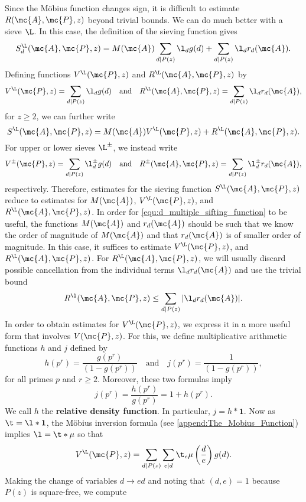     Since the M\"obius function changes sign, it is difficult to estimate $R(\mc{A},\mc{P},z)$ beyond trivial bounds. We can do much better with a sieve $\L$. In this case, the definition of the sieving function gives
    \[
      S_{d}^{\L}(\mc{A},\mc{P},z) = M(\mc{A})\sum_{d \mid P(z)}\l_{d}g(d)+\sum_{d \mid P(z)}\l_{d}r_{d}(\mc{A}).
    \]
    Defining functions $V^{\L}(\mc{P},z)$ and $R^{\L}(\mc{A},\mc{P},z)$ by
     \[
      V^{\L}(\mc{P},z) = \sum_{d \mid P(z)}\l_{d}g(d) \quad \text{and} \quad R^{\L}(\mc{A},\mc{P},z) = \sum_{d \mid P(z)}\l_{d}r_{d}(\mc{A}),
    \]
    for $z \ge 2$, we can further write
    \[
      S^{\L}(\mc{A},\mc{P},z) = M(\mc{A})V^{\L}(\mc{P},z)+R^{\L}(\mc{A},\mc{P},z).
    \]
    For upper or lower sieves $\L^{\pm}$, we instead write
     \[
      V^{\pm}(\mc{P},z) = \sum_{d \mid P(z)}\l_{d}^{\pm}g(d) \quad \text{and} \quad R^{\pm}(\mc{A},\mc{P},z) = \sum_{d \mid P(z)}\l_{d}^{\pm}r_{d}(\mc{A}),
    \]
    respectively. Therefore, estimates for the sieving function $S^{\L}(\mc{A},\mc{P},z)$ reduce to estimates for $M(\mc{A})$, $V^{\L}(\mc{P},z)$, and $R^{\L}(\mc{A},\mc{P},z)$. In order for \cref{equ:d_multiple_sifting_function} to be useful, the functions $M(\mc{A})$ and $r_{d}(\mc{A})$ should be such that we know the order of magnitude of $M(\mc{A})$ and that $r_{d}(\mc{A})$ is of smaller order of magnitude. In this case, it suffices to estimate $V^{\L}(\mc{P},z)$, and $R^{\L}(\mc{A},\mc{P},z)$. For $R^{\L}(\mc{A},\mc{P},z)$, we will usually discard possible cancellation from the individual terms $\l_{d}r_{d}(\mc{A})$ and use the trivial bound
    \[
      R^{\l}(\mc{A},\mc{P},z) \le \sum_{d \mid P(z)}|\l_{d}r_{d}(\mc{A})|.
    \]
    In order to obtain estimates for $V^{\L}(\mc{P},z)$, we express it in a more useful form that involves $V(\mc{P},z)$. For this, we define multiplicative arithmetic functions $h$ and $j$ defined by
    \[
      h(p^{r}) = \frac{g(p^{r})}{(1-g(p^{r}))} \quad \text{and} \quad j(p^{r}) = \frac{1}{(1-g(p^{r}))},
    \]
    for all primes $p$ and $r \ge 2$. Moreover, these two formulas imply
    \[
      j(p^{r}) = \frac{h(p^{r})}{g(p^{r})} = 1+h(p^{r}).
    \]
    We call $h$ the \textbf{relative density function}. In particular, $j = h \ast \mathbf{1}$. Now as $\t = \l \ast \mathbf{1}$, the M\"obius inversion formula (see \cref{append:The_Mobius_Function}) implies $\l = \t \ast \mu$ so that
    \[
      V^{\L}(\mc{P},z) = \sum_{d \mid P(z)}\sum_{e \mid d}\t_{e}\mu\left(\frac{d}{e}\right)g(d).
    \]
    Making the change of variables $d \to ed$ and noting that $(d,e) = 1$ because $P(z)$ is square-free, we compute
